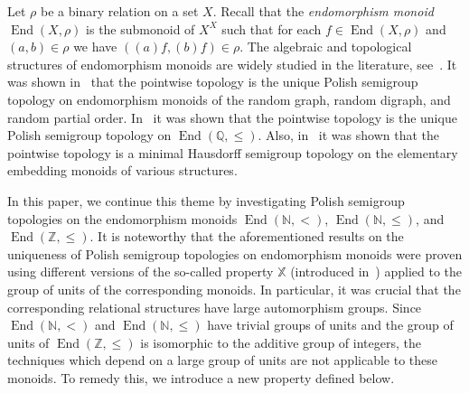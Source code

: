 \documentclass[11pt]{amsart}
\theoremstyle{definition}
\newcommand{\N}{\mathbb N}
\newcommand{\Zendd}{\operatorname{End}(\mathbb Z, \leq)}
\newcommand{\End}{\operatorname{End}(\mathbb N, <)}
\newcommand{\Endd}{\operatorname{End}(\mathbb N, \leq)}
\newcommand{\Sym}{\operatorname{Sym}}
\begin{document}
Let $\rho$ be a binary relation on a set $X$. Recall that the {\em endomorphism monoid} $\operatorname{End}(X,\rho)$ is the submonoid of $X^X$ such that for each $f\in \operatorname{End}(X,\rho)$ and $(a,b)\in\rho$ we have $((a)f,(b)f)\in\rho$. The algebraic and topological structures of endomorphism monoids are widely studied in the literature, see~\cite{Blyth, Bodirsky, BEKP, Coleman, EJMPP, Gunturkun, MP, Pinskernew, PiSc2, PiSc}. It was shown in~\cite{EJMPP} that the pointwise topology is the unique Polish semigroup topology on endomorphism monoids of the random graph, random digraph, and random partial order. 
In~\cite{PiSc} it was shown that the pointwise topology is the unique Polish semigroup topology on $\operatorname{End}(\mathbb Q,\leq)$. Also, in~\cite{Pinskernew} it was shown that the pointwise topology is a minimal Hausdorff semigroup topology on the elementary embedding monoids of various structures.


In this paper, we continue this theme by investigating Polish semigroup topologies on the endomorphism monoids $\End$, $\Endd$, and $\Zendd$. 
It is noteworthy that the aforementioned results on the uniqueness of Polish semigroup topologies on endomorphism monoids were proven using different versions of the so-called property $\mathbb X$ (introduced in~\cite{main}) applied to the group of units of the corresponding monoids. 
In particular, it was crucial that the corresponding relational structures have large automorphism groups.
Since $\End$ and $\Endd$ have trivial groups of units and the group of units of $\Zendd$ is isomorphic to the additive group of integers, the techniques which depend on a large group of units are not applicable to these monoids. 
To remedy this, we introduce a new property defined below.

\end{document}
